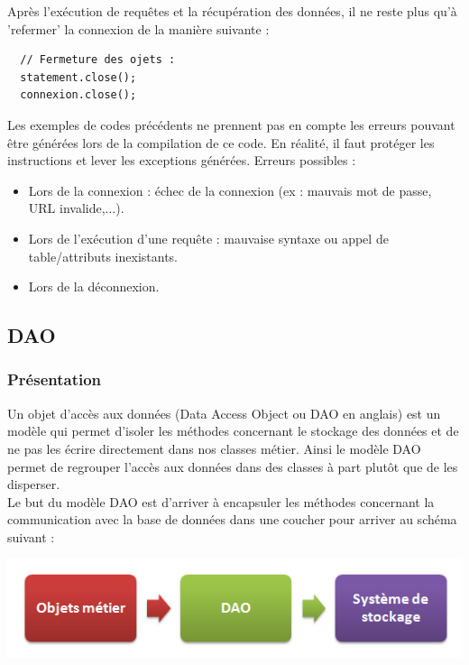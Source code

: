 Après l'exécution de requêtes et la récupération des données, il ne reste plus qu'à 'refermer' la connexion de la manière suivante :
\begin{lstlisting}
  // Fermeture des ojets :
  statement.close();
  connexion.close();
\end{lstlisting}

Les exemples de codes précédents ne prennent pas en compte les erreurs pouvant être générées lors de la compilation de ce code.
En réalité, il faut protéger les instructions et lever les exceptions générées.
Erreurs possibles :
\begin{itemize}
 \item Lors de la connexion : échec de la connexion (ex : mauvais mot de passe, URL invalide,...).
 \item Lors de l'exécution d'une requête : mauvaise syntaxe ou appel de table/attributs inexistants.
 \item Lors de la déconnexion.
\end{itemize}


\subsection{DAO}

\subsubsection{Présentation}
Un objet d'accès aux données (Data Access Object ou DAO en anglais) est un modèle qui permet d'isoler les méthodes concernant le stockage des données et de ne pas les écrire directement dans nos classes métier. Ainsi le modèle DAO permet de regrouper l'accès aux données dans des classes à part plutôt que de les disperser. \\

Le but du modèle DAO est d'arriver à encapsuler les méthodes concernant la communication avec la base de données dans une coucher pour arriver au schéma suivant :

\begin{center}
\includegraphics[scale=0.5]{../graph/dao1.png} \\
\end{center}

